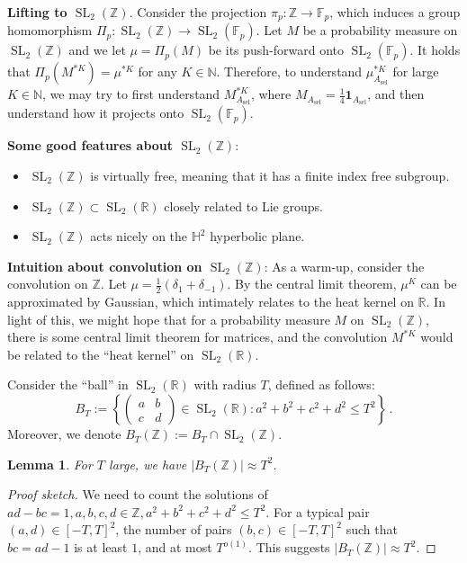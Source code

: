 \documentclass[12pt]{amsart}
\newtheorem{lemma}[theorem]{Lemma}
\newcommand{\F}{\mathbb{F}}
\newcommand{\ZZ}{\mathbb{Z}}
\newcommand{\RR}{\mathbb{R}}
\begin{document}
\textbf{Lifting to $\operatorname{SL}_2(\ZZ)$}. Consider the projection $\pi_p:\mathbb Z\to \F_p$, which induces a group homomorphism $\Pi_p:\operatorname{SL}_2(\ZZ)\to \operatorname{SL}_2(\F_p)$. Let $M$ be a probability measure on $\operatorname{SL}_2(\mathbb Z)$ and we let $\mu=\Pi_p(M)$ be its push-forward onto $\operatorname{SL}_2(\F_p)$. It holds that $\Pi_p(M^{\ast K})=\mu^{\ast K}$ for any $K\in \mathbb N$. Therefore, to understand $\mu_{A_{\operatorname{sel}}}^{\ast K}$ for large $K\in \mathbb N$, we may try to first understand $M_{A_{\operatorname{sel}}}^{\ast K}$, where $M_{A_{\operatorname{sel}}}=\frac{1}{4}\mathbf{1}_{{A}_{\operatorname{sel}}}$, and then understand how it projects onto $\operatorname{SL}_2(\F_p)$. 

\textbf{Some good features about $\operatorname{SL}_2(\ZZ)$}: 
\begin{itemize}
    \item[(1)] $\operatorname{SL}_2(\ZZ)$ is virtually free, meaning that it has a finite index free subgroup. 
    \item [(2a)] $\operatorname{SL}_2(\ZZ)\subset \operatorname{SL}_2(\RR)$ closely related to Lie groups.
    \item [(2b)] $\operatorname{SL}_2(\ZZ)$ acts nicely on the $\mathbb{H}^2$ hyperbolic plane. 
\end{itemize}

\textbf{Intuition about convolution on $\operatorname{SL}_2(\ZZ)$}: As a warm-up, consider the convolution on $\mathbb Z$. Let $\mu=\frac{1}{2}(\delta_1+\delta_{-1})$. By the central limit theorem, $\mu^K$ can be approximated by Gaussian, which intimately relates to the heat kernel on $\mathbb R$. In light of this, we might hope that for a probability measure $M$ on $\operatorname{SL}_2(\ZZ)$, there is some central limit theorem for matrices, and the convolution $M^{\ast K}$ would be related to the ``heat kernel'' on $\operatorname{SL}_2(\RR)$.  

Consider the ``ball'' in $\operatorname{SL}_2(\RR)$ with radius $T$, defined as follows:
\[
B_T:=\left\{\left(\begin{matrix}
    a&b\\
    c&d
\end{matrix}\right)\in \operatorname{SL}_2(\RR):a^2+b^2+c^2+d^2\le T^2\right\}\,.
\]
Moreover, we denote $B_T(\ZZ):=B_T\cap \operatorname{SL}_2(\ZZ)$. 
\begin{lemma}
   For $T$ large, we have $|B_T(\ZZ)|\approx T^2$.
\end{lemma}
\begin{proof}[Proof sketch]
    We need to count the solutions of $ad-bc=1,a,b,c,d\in \mathbb Z,a^2+b^2+c^2+d^2\le T^2$. For a typical pair $(a,d)\in [-T,T]^2$, the number of pairs $(b,c)\in [-T,T]^2$ such that $bc=ad-1$ is at least $1$, and at most $T^{o(1)}$. This suggests $|B_T(\ZZ)|\approx T^2$. 
\end{proof}
\end{document}
